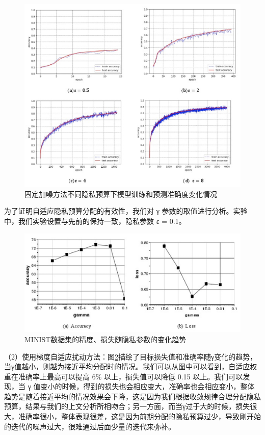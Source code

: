 \begin{figure}[!hbt]
\centering
  	\includegraphics[scale=0.6]{fig2/C5/不同梯度剪裁}%
	\caption{固定加噪方法不同隐私预算下模型训练和预测准确度变化情况}
  	\label{fig:固定加噪方法不同隐私预算下模型训练和预测准确度随训练轮数变化情况 
} 
\end{figure}

为了证明自适应隐私预算分配的有效性，我们对 γ 参数的取值进行分析。实验中，我们实验设置与先前的保持一致，隐私参数 ε = 0.1。

\begin{figure}[!hbt]
\centering
  	\includegraphics[scale=0.6]{fig2/C5/minist实验}%
	\caption{MINIST数据集的精度、损失随隐私参数的变化趋势}
  	\label{fig:MINIST数据集的精度、损失随参数的变化趋势} 
\end{figure}

（2）使用梯度自适应扰动方法：图\ref{fig:MINIST数据集的精度、损失随参数的变化趋势}描绘了目标损失值和准确率随γ变化的趋势，当γ值越小，则越为接近平均分配时的情况。我们可以从图中可以看到，自适应权重在准确率上最高可以提高 6$\%$ 以上，损失值可以降低 0.15 以上。我们可以发现，当 γ 值变小的时候，得到的损失也会相应变大，准确率也会相应变小，整体趋势是随着接近平均的情况效果会下降，这是因为我们根据收敛规律合理分配隐私预算，结果与我们的上文分析所相吻合；另一方面，而当γ过于大的时候，损失很大，准确率很小，整体表现很差，这是因为前期分配的隐私预算过少，导致刚开始的迭代的噪声过大，很难通过后面少量的迭代来弥补。


